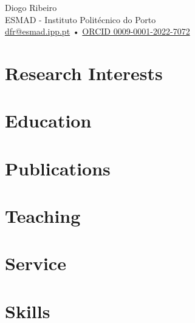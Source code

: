\documentclass[11pt,a4paper]{article}
\begin{document}
\begin{center}
  {\LARGE Diogo Ribeiro}\\[4pt]
  ESMAD - Instituto Politécnico do Porto\\
  \href{mailto:dfr@esmad.ipp.pt}{dfr@esmad.ipp.pt} • \href{https://orcid.org/0009-0001-2022-7072}{ORCID 0009-0001-2022-7072}
\end{center}

\section*{Research Interests}

\section*{Education}

\section*{Publications}

\section*{Teaching}

\section*{Service}

\section*{Skills}
\end{document}
